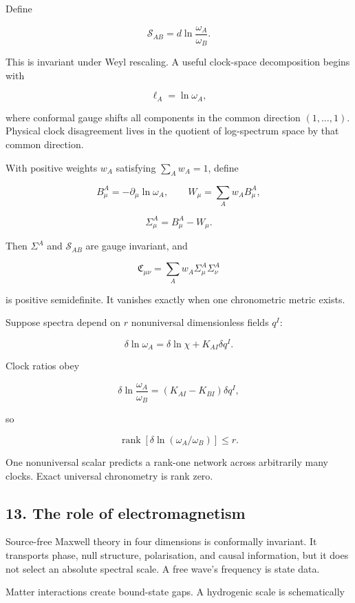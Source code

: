 \documentclass[
]{article}
\begin{document}
Define

\[
\boxed{
\mathcal S_{AB}=d\ln\frac{\omega_A}{\omega_B}.
}
\]

This is invariant under Weyl rescaling. A useful clock-space
decomposition begins with

\[
\ell_A=\ln\omega_A,
\]

where conformal gauge shifts all components in the common direction
\((1,\ldots,1)\). Physical clock disagreement lives in the quotient of
log-spectrum space by that common direction.

With positive weights \(w_A\) satisfying \(\sum_Aw_A=1\), define

\[
B^A_\mu=-\partial_\mu\ln\omega_A,
\qquad
W_\mu=\sum_Aw_AB^A_\mu,
\]

\[
\Sigma^A_\mu=B^A_\mu-W_\mu.
\]

Then \(\Sigma^A\) and \(\mathcal S_{AB}\) are gauge invariant, and

\[
\mathfrak C_{\mu\nu}=\sum_Aw_A\Sigma^A_\mu\Sigma^A_\nu
\]

is positive semidefinite. It vanishes exactly when one chronometric
metric exists.

Suppose spectra depend on \(r\) nonuniversal dimensionless fields
\(q^I\):

\[
\delta\ln\omega_A
=\delta\ln\chi+K_{AI}\delta q^I.
\]

Clock ratios obey

\[
\delta\ln\frac{\omega_A}{\omega_B}
=(K_{AI}-K_{BI})\delta q^I,
\]

so

\[
\boxed{
\operatorname{rank}\left[\delta\ln(\omega_A/\omega_B)\right]\le r.
}
\]

One nonuniversal scalar predicts a rank-one network across arbitrarily
many clocks. Exact universal chronometry is rank zero.

\subsection{13. The role of
electromagnetism}\label{the-role-of-electromagnetism}

Source-free Maxwell theory in four dimensions is conformally invariant.
It transports phase, null structure, polarisation, and causal
information, but it does not select an absolute spectral scale. A free
wave's frequency is state data.

Matter interactions create bound-state gaps. A hydrogenic scale is
schematically
\end{document}
